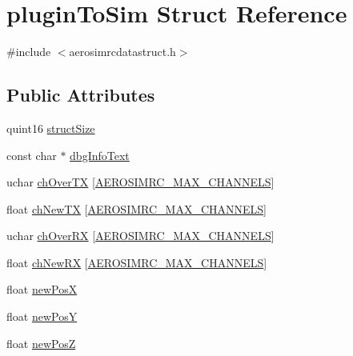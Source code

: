 \hypertarget{structplugin_to_sim}{\section{plugin\-To\-Sim \-Struct \-Reference}
\label{structplugin_to_sim}
}


{\ttfamily \#include $<$aerosimrcdatastruct.\-h$>$}

\subsection*{\-Public \-Attributes}
\begin{DoxyCompactItemize}
\item 
quint16 \hyperlink{group___aero_sim_r_c_ga785b39329b27020e1525b4999a10d230}{struct\-Size}
\item 
const char $\ast$ \hyperlink{group___aero_sim_r_c_ga8d1dec1f6592d85b15941b3ce658f44a}{dbg\-Info\-Text}
\item 
uchar \hyperlink{group___aero_sim_r_c_ga77e9265e0ad99dcc6a7c5cc35da0481d}{ch\-Over\-T\-X} \mbox{[}\hyperlink{group___aero_sim_r_c_ga63f989ac10cdcbfefadc5e65055d3c7d}{\-A\-E\-R\-O\-S\-I\-M\-R\-C\-\_\-\-M\-A\-X\-\_\-\-C\-H\-A\-N\-N\-E\-L\-S}\mbox{]}
\item 
float \hyperlink{group___aero_sim_r_c_ga69be322d9251f2d0881402e3bb8b79cc}{ch\-New\-T\-X} \mbox{[}\hyperlink{group___aero_sim_r_c_ga63f989ac10cdcbfefadc5e65055d3c7d}{\-A\-E\-R\-O\-S\-I\-M\-R\-C\-\_\-\-M\-A\-X\-\_\-\-C\-H\-A\-N\-N\-E\-L\-S}\mbox{]}
\item 
uchar \hyperlink{group___aero_sim_r_c_ga3fe5834da184407de8227a046d5a7de7}{ch\-Over\-R\-X} \mbox{[}\hyperlink{group___aero_sim_r_c_ga63f989ac10cdcbfefadc5e65055d3c7d}{\-A\-E\-R\-O\-S\-I\-M\-R\-C\-\_\-\-M\-A\-X\-\_\-\-C\-H\-A\-N\-N\-E\-L\-S}\mbox{]}
\item 
float \hyperlink{group___aero_sim_r_c_gaa465d9eaa30d7a906bd3672768e5b380}{ch\-New\-R\-X} \mbox{[}\hyperlink{group___aero_sim_r_c_ga63f989ac10cdcbfefadc5e65055d3c7d}{\-A\-E\-R\-O\-S\-I\-M\-R\-C\-\_\-\-M\-A\-X\-\_\-\-C\-H\-A\-N\-N\-E\-L\-S}\mbox{]}
\item 
float \hyperlink{group___aero_sim_r_c_ga2067141174f8fa27f36b9831b73b5668}{new\-Pos\-X}
\item 
float \hyperlink{group___aero_sim_r_c_gab0bd49c25f923d60f12c350160c63f4f}{new\-Pos\-Y}
\item 
float \hyperlink{group___aero_sim_r_c_ga85e01d3ec1ec3924a0482565262ccd80}{new\-Pos\-Z}
\item 

\end{DoxyCompactItemize}
